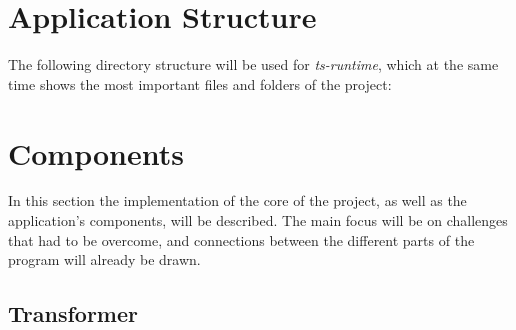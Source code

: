 %

\section{Application Structure}
\label{sec:structure}

The following directory structure will be used for \emph{ts-runtime}, which at the same time shows the most important files and folders of the project:

\section{Components}
\label{sec:components}


In this section the implementation of the core of the project, as well as the application's components, will be described. The main focus will be on challenges that had to be overcome, and connections between the different parts of the program will already be drawn.

\subsection{Transformer}

